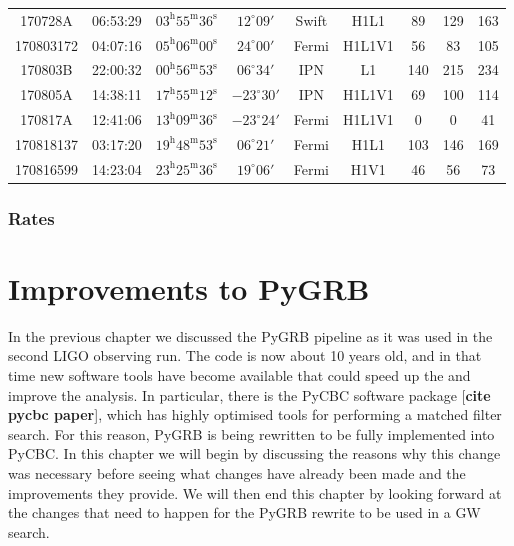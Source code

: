 \documentclass[11pt]{cuthesis}
\begin{document}
\begin{landscape}
\begin{tabular}{ccccccccc}
170728A   & 06:53:29  & $03^{\mathrm{h}}55^{\mathrm{m}}36^{\mathrm{s}}$ & $12^{\circ}09'$ &  Swift   & H1L1   & 89  & 129 & 163 \\
170803172 & 04:07:16  & $05^{\mathrm{h}}06^{\mathrm{m}}00^{\mathrm{s}}$ & $24^{\circ}00'$ &  Fermi   & H1L1V1 & 56  & 83  & 105 \\
170803B   & 22:00:32  & $00^{\mathrm{h}}56^{\mathrm{m}}53^{\mathrm{s}}$ & $06^{\circ}34'$ &  IPN   & L1       & 140 & 215 & 234 \\
170805A   & 14:38:11  & $17^{\mathrm{h}}55^{\mathrm{m}}12^{\mathrm{s}}$ & $-23^{\circ}30'$ & IPN   & H1L1V1   & 69  & 100 & 114 \\
170817A   & 12:41:06  & $13^{\mathrm{h}}09^{\mathrm{m}}36^{\mathrm{s}}$ & $-23^{\circ}24'$ & Fermi   & H1L1V1 & 0   & 0   & 41 \\
170818137 & 03:17:20  & $19^{\mathrm{h}}48^{\mathrm{m}}53^{\mathrm{s}}$ & $06^{\circ}21'$ &  Fermi   & H1L1   & 103 & 146 & 169 \\
170816599 & 14:23:04  & $23^{\mathrm{h}}25^{\mathrm{m}}36^{\mathrm{s}}$ & $19^{\circ}06'$ &  Fermi   & H1V1   & 46  & 56  & 73 \\ 
\end{tabular}
\label{tab:grbs}
\end{landscape}

\subsection{Rates}

\chapter{Improvements to PyGRB} \label{sec:pygrb improvements}
In the previous chapter we discussed the PyGRB pipeline as it was used in the second LIGO observing run. The code is now about 10 years old, and in that time new software tools have become available that could speed up the and improve the analysis. In particular, there is the PyCBC software package [\textbf{cite pycbc paper}], which has highly optimised tools for performing a matched filter search. For this reason, PyGRB is being rewritten to be fully implemented into PyCBC. In this chapter we will begin by discussing the reasons why this change was necessary before seeing what changes have already been made and the improvements they provide. We will then end this chapter by looking forward at the changes that need to happen for the PyGRB rewrite to be used in a GW search.
\end{document}

